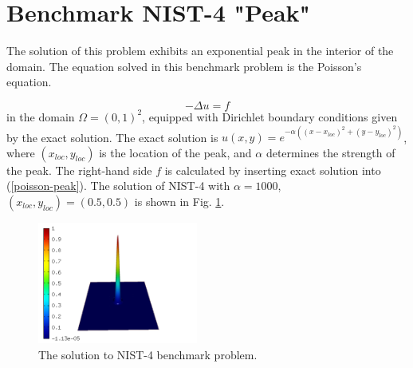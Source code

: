 \documentclass[12pt]{elsarticle}
\begin{document}

\section{Benchmark NIST-4 "Peak"}
\label{sec:bench-4}

The solution of this problem exhibits an exponential peak in the interior of the domain.
The equation solved in this benchmark problem is the Poisson's equation.

\begin{equation} \label{poisson-peak}
-\Delta u = f
\end{equation}
in the domain $\Omega = (0, 1)^2$, equipped with Dirichlet
boundary conditions given by the exact solution.
The exact solution is
$u(x,y) = e^{-\alpha ((x - x_{loc})^{2} + (y - y_{loc})^{2})}$,
where $(x_{loc}, y_{loc})$ is the location of the peak,
and $\alpha$ determines the strength of the peak.
The right-hand side $f$ is calculated by inserting exact solution into (\ref{poisson-peak}).
The solution of NIST-4 with $\alpha = 1000$,
$(x_{loc}, y_{loc}) = (0.5, 0.5)$ is shown in Fig. \ref{fig:sln-nist04}.

\begin{figure}[!ht]
\centering
\includegraphics[height=4cm]{nist/nist-4/solution.png}
\caption{The solution to NIST-4 benchmark problem.}
\label{fig:sln-nist04}
\end{figure}
\end{document}
